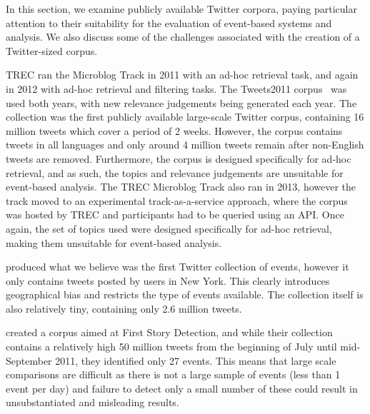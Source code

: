 \label{sec:corproa}
In this section, we examine publicly available Twitter corpora, paying particular attention to their suitability for the evaluation of event-based systems and analysis.
We also discuss some of the challenges associated with the creation of a Twitter-sized corpus.

TREC ran the Microblog Track in 2011 with an ad-hoc retrieval task, and again in 2012 with ad-hoc retrieval and filtering tasks.
The Tweets2011 corpus~\cite{McCreadie:2012:BRT:2348283.2348495} was used both years, with new relevance judgements being generated each year.
The collection was the first publicly available large-scale Twitter corpus, containing 16 million tweets which cover a period of 2 weeks.
However, the corpus contains tweets in all languages and only around 4 million tweets remain after non-English tweets are removed.
Furthermore, the corpus is designed specifically for ad-hoc retrieval, and as such, the topics and relevance judgements are unsuitable for event-based analysis.
The TREC Microblog Track also ran in 2013, however the track moved to an experimental track-as-a-service approach, where the corpus was hosted by TREC and participants had to be queried using an API.  Once again, the set of topics used were designed specifically for ad-hoc retrieval, making them unsuitable for event-based analysis.

\cite{Becker:2012:ICP:2124295.2124360} produced what we believe was the first Twitter collection of events, however it only contains tweets posted by users in New York.
This clearly introduces geographical bias and restricts the type of events available.
The collection itself is also relatively tiny, containing only 2.6 million tweets.

\cite{Petrovic:2012:UPI:2382029.2382072} created a corpus aimed at First Story Detection, and while their collection contains a relatively high 50 million tweets from the beginning of July until mid-September 2011, they identified only 27 events.
This means that large scale comparisons are difficult as there is not a large sample of events (less than 1 event per day) and failure to detect only a small number of these could result in unsubstantiated and misleading results.

